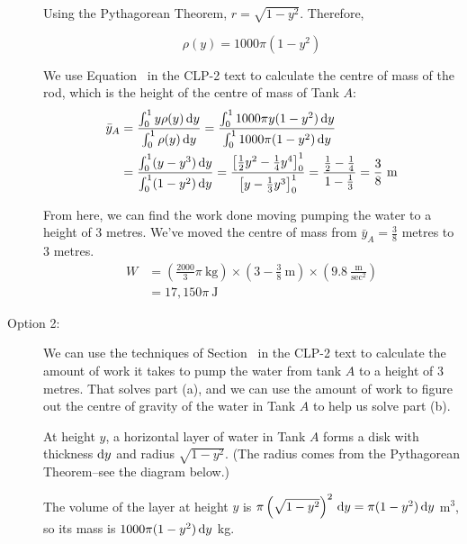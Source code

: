 \begin{solution}
\begin{description}
Using the Pythagorean Theorem, $r = \sqrt{1-y^2}$. Therefore,

\[\rho(y)= 1000\pi(1-y^2)\]

We use Equation~ in the CLP-2 text to calculate the centre of mass of the rod, which is the height of the centre of mass of Tank $A$:
\begin{align*}
\bar y_A&=\frac{\int_0^1 y\rho(y)\,\mathrm{d}y}{\int_0^1 \rho(y)\,\mathrm{d}y} =
\frac{\int_0^1 1000\pi y(1-y^2)\,\mathrm{d}y}{\int_0^1 1000\pi(1-y^2)\,\mathrm{d}y}\\
&=\frac{\int_0^1(y-y^3)\,\mathrm{d}y}{\int_0^1(1-y^2)\,\mathrm{d}y} = \frac{\left[\frac{1}{2}y^2 - \frac{1}{4}y^4\right]_0^1}{\left[y-\frac{1}{3}y^3\right]_0^1} = \frac{\frac{1}{2}-\frac{1}{4}}{1-\frac{1}{3}}=\frac{3}{8}~\text{m}
\end{align*}

From here, we can find the work done moving pumping the water to a height of 3 metres. We've moved the centre of mass from $\bar y_A = \frac{3}{8}$ metres to 3 metres.
\begin{align*}
W&=\left(\frac{2000}{3}\pi~\text{kg}\right)\times\left(3 - \frac{3}{8}~\text{m}\right)\times\left(9.8 ~\frac{\text{m}}{\text{sec}^2}\right)\\
&=17,150\pi~\text{J}
\end{align*}
\item[Option 2:] We can use the techniques of Section~
 in the CLP-2 text to calculate the amount of work it takes to pump the water from tank $A$ to a height of 3 metres. That solves part (a), and we can use the amount of work to figure out the centre of gravity of the water in Tank $A$ to help us solve part (b).

At height $y$, a horizontal layer of water in Tank $A$ forms a disk with thickness $\mathrm{d}y$ and radius $\sqrt{1-y^2}$. (The radius  comes from the Pythagorean Theorem--see  the diagram below.)

\begin{center}\end{center}

The volume of the layer at height $y$ is $\pi \left(\sqrt{1-y^2}\right)^2\,\mathrm{d}y = \pi(1-y^2)\,\mathrm{d}y$ m$^3$, so its mass is $1000\pi(1-y^2)\,\mathrm{d}y$ kg.


\end{description}
\end{solution}
